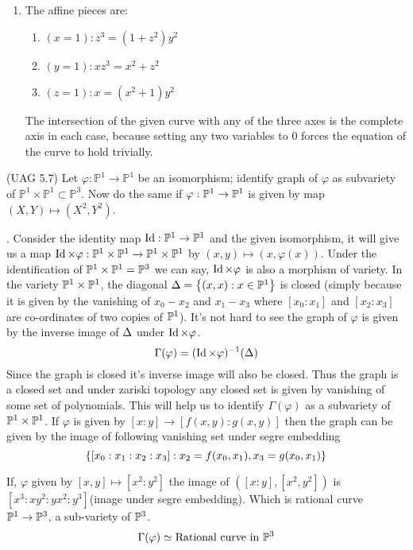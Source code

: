 \documentclass[12pt]{article}
\begin{document}
\begin{enumerate}[label = (\alph*)]
    \item The affine pieces are:
          \begin{enumerate}[label = (\roman*)]
              \item \( (x=1): z^3=(1+z^2)y^2 \)
              \item \( (y=1): xz^3=x^2+z^2 \)
              \item \( (z=1): x=(x^2+1)y^2 \)
          \end{enumerate}
          The intersection of the given curve with any of the three axes is the complete axis in each case, because setting any two variables to 0 forces the equation of the curve to hold trivially.
\end{enumerate}

\begin{prob} %
    (UAG 5.7) Let $\varphi : \mathbb{P}^1 \to \mathbb{P}^1$ be an isomorphism; identify graph of $\varphi$ as subvariety of $\mathbb{P}^1 \times \mathbb{P}^1\subset \mathbb{P}^3$. Now do the same if $\varphi : \mathbb{P}^1 \to \mathbb{P}^1$ is given by map $(X,Y)\mapsto (X^2,Y^2)$.
\end{prob}

\sol. Consider the identity map $\operatorname{Id} : \mathbb{P}^1 \to \mathbb{P}^1$ and the given isomorphism, it will give us a map $\operatorname{Id} \times \varphi :\mathbb{P}^1 \times \mathbb{P}^1 \to \mathbb{P}^1\times \mathbb{P}^1$ by $(x,y)\mapsto (x,\varphi(x))$. Under the identification of $\mathbb{P}^1 \times \mathbb{P}^1 = \mathbb{P}^3$ we can say, $\operatorname{Id} \times \varphi$ is also a morphism of variety. In the variety $\mathbb{P}^1 \times \mathbb{P}^1$, the diagonal $\Delta = \qty{(x,x): x \in \mathbb{P}^1}$ is closed (simply because it is given by the vanishing of $x_0-x_2$ and $x_1-x_3$ where $[x_0:x_1]$ and $[x_2:x_3]$ are co-ordinates of two copies of $\mathbb{P}^1$). It's not hard to see the graph of $\varphi$ is given by the inverse image of $\Delta$ under $\operatorname{Id} \times \varphi$. $$\Gamma(\varphi)= (\operatorname{Id} \times \varphi)^{- 1}(\Delta)$$ Since the graph is closed it's inverse image will also be closed. Thus the graph is a closed set and under zariski topology any closed set is given by vanishing of some set of polynomials. This will help us to identify $\Gamma(\varphi)$ as a subvariety of $\mathbb{P}^1\times \mathbb{P}^1$. If $\varphi$ is given by $[x:y]\to [f(x,y):g(x,y)]$ then the graph can be given by the image of following vanishing set under segre embedding $$\qty{[x_0:x_1:x_2:x_3]: x_2 =f(x_0,x_1), x_3=g(x_0,x_1)}$$

\vspace*{0.2cm}

\noindent If, $\varphi$ given by $[x,y]\mapsto [x^2:y^2]$ the image of $([x:y],[x^2,y^2])$ is $[x^3:xy^2:yx^2:y^3]$(image under segre embedding). Which is rational curve $\mathbb{P}^1 \to \mathbb{P}^3$, a sub-variety of $\mathbb{P}^3$.
$$\Gamma(\varphi)\simeq \text{Rational curve in }\mathbb{P}^3$$
\end{document}
